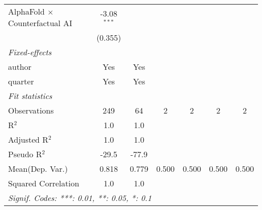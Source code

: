 \begin{tabular}{lcccccc}
   AlphaFold $\times$ Counterfactual AI  & -3.08$^{***}$ &                &     &     &     &   \\   
                                         & (0.355)       &                &     &     &     &   \\   
   \midrule
   \emph{Fixed-effects}\\
   author                                & Yes           & Yes            &     &     &     & \\  
   quarter                               & Yes           & Yes            &     &     &     & \\  
   \midrule
   \emph{Fit statistics}\\
   Observations                          & 249           & 64             & 2   & 2   & 2   & 2\\  
   R$^2$                                 & 1.0           & 1.0            &     &     &     & \\  
   Adjusted R$^2$                        & 1.0           & 1.0            &     &     &     & \\  
   Pseudo R$^2$                          & -29.5         & -77.9          &     &     &     & \\  
Mean(Dep. Var.) & 0.818 & 0.779 & 0.500 & 0.500 & 0.500 & 0.500 \\
   Squared Correlation                   & 1.0           & 1.0            &     &     &     & \\  
   \midrule \midrule
   \multicolumn{7}{l}{\emph{Signif. Codes: ***: 0.01, **: 0.05, *: 0.1}}\\
\end{tabular}
\par\endgroup
